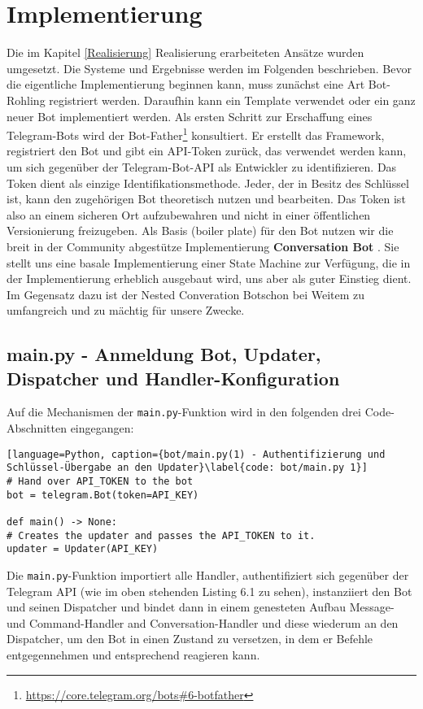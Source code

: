 \chapter{Implementierung} \label{Implementierung}


    Die im Kapitel \ref*{Realisierung} Realisierung erarbeiteten Ansätze wurden umgesetzt. Die Systeme und Ergebnisse werden im Folgenden beschrieben. Bevor die eigentliche Implementierung beginnen kann, muss zunächst eine Art Bot-Rohling registriert werden. Daraufhin kann ein Template verwendet oder ein ganz neuer Bot implementiert werden. Als ersten Schritt zur Erschaffung eines Telegram-Bots wird der Bot-Father\footnote{\url{https://core.telegram.org/bots\#6-botfather}} konsultiert. Er erstellt das Framework, registriert den Bot und gibt ein API-Token zurück, das verwendet werden kann, um sich gegenüber der Telegram-Bot-API als Entwickler zu identifizieren. \cite{telegramAPI} Das Token dient als einzige Identifikationsmethode. Jeder, der in Besitz des Schlüssel ist, kann den zugehörigen Bot theoretisch nutzen und bearbeiten. Das Token ist also an einem sicheren Ort aufzubewahren und nicht in einer öffentlichen Versionierung freizugeben.
    Als Basis (boiler plate) für den Bot nutzen wir die breit in der Community abgestütze Implementierung \textbf{Conversation Bot} \cite{conversationBot}. Sie stellt uns eine basale Implementierung einer State Machine zur Verfügung, die in der Implementierung erheblich ausgebaut wird, uns aber als guter Einstieg dient. Im Gegensatz dazu ist der \glqq Nested Converation Bot\grqq schon bei Weitem zu umfangreich und zu mächtig für unsere Zwecke.






    \section{main.py - Anmeldung Bot, Updater, Dispatcher und Handler-Konfiguration} \label{main.py}
        Auf die Mechanismen der \verb|main.py|-Funktion wird in den folgenden drei Code-Abschnitten eingegangen:
        \begin{lstlisting}[language=Python, caption={bot/main.py(1) - Authentifizierung und Schlüssel-Übergabe an den Updater}\label{code: bot/main.py 1}]
# Hand over API_TOKEN to the bot
bot = telegram.Bot(token=API_KEY)

def main() -> None:
# Creates the updater and passes the API_TOKEN to it.
updater = Updater(API_KEY)
        \end{lstlisting}
        Die \verb|main.py|-Funktion importiert alle Handler, authentifiziert sich gegenüber der Telegram API (wie im oben stehenden Listing 6.1 zu sehen), instanziiert den Bot und seinen Dispatcher und bindet dann in einem genesteten Aufbau Message- und Command-Handler and Conversation-Handler und diese wiederum an den Dispatcher, um den Bot in einen Zustand zu versetzen, in dem er Befehle entgegennehmen und entsprechend reagieren kann. \\
        
